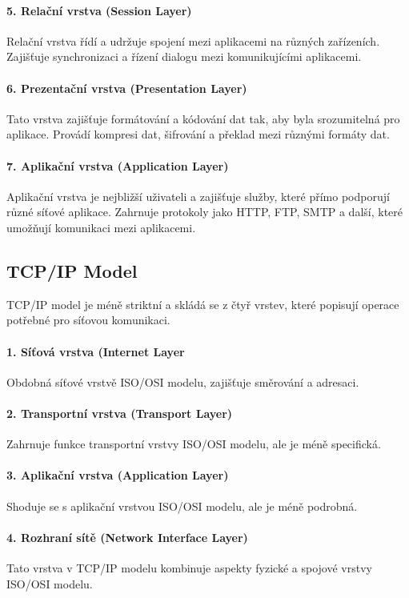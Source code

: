 \paragraph{5. Relační vrstva (Session Layer)} Relační vrstva řídí a udržuje spojení mezi aplikacemi na různých zařízeních. Zajišťuje synchronizaci a řízení dialogu mezi komunikujícími aplikacemi.

\paragraph{6. Prezentační vrstva (Presentation Layer)} Tato vrstva zajišťuje formátování a kódování dat tak, aby byla srozumitelná pro aplikace. Provádí kompresi dat, šifrování a překlad mezi různými formáty dat.

\paragraph{7. Aplikační vrstva (Application Layer)} Aplikační vrstva je nejbližší uživateli a zajišťuje služby, které přímo podporují různé síťové aplikace. Zahrnuje protokoly jako HTTP, FTP, SMTP a další, které umožňují komunikaci mezi aplikacemi.

\subsection{TCP/IP Model}
TCP/IP model je méně striktní a skládá se z čtyř vrstev, které popisují operace potřebné pro síťovou komunikaci.

\paragraph{1. Síťová vrstva (Internet Layer}
Obdobná síťové vrstvě ISO/OSI modelu, zajišťuje směrování a adresaci.
\paragraph{2. Transportní vrstva (Transport Layer)}
Zahrnuje funkce transportní vrstvy ISO/OSI modelu, ale je méně specifická.
\paragraph{3. Aplikační vrstva (Application Layer)}
Shoduje se s aplikační vrstvou ISO/OSI modelu, ale je méně podrobná.
\paragraph{4. Rozhraní sítě (Network Interface Layer)}
Tato vrstva v TCP/IP modelu kombinuje aspekty fyzické a spojové vrstvy ISO/OSI modelu.

